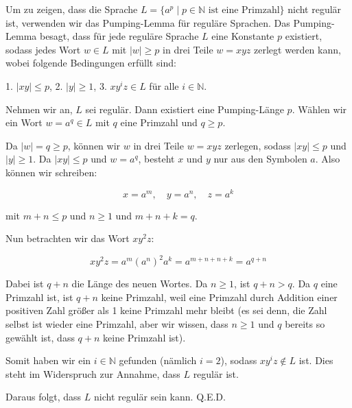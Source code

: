 \documentclass{uebungsblatt}
\begin{document}
\begin{loesung}
	Um zu zeigen, dass die Sprache $L = \{ a^p \mid p \in \mathbb{N} \text{ ist eine Primzahl} \} $ nicht regulär ist, verwenden wir das Pumping-Lemma für reguläre Sprachen. Das Pumping-Lemma besagt, dass für jede reguläre Sprache $L$ eine Konstante $p$ existiert, sodass jedes Wort $w \in L$ mit $|w| \geq p$ in drei Teile $w = xyz$ zerlegt werden kann, wobei folgende Bedingungen erfüllt sind:

	1. $|xy| \leq p$,
	2. $|y| \geq 1$,
	3. $xy^i z \in L$ für alle $i \in \mathbb{N}$.

	Nehmen wir an, $L$ sei regulär. Dann existiert eine Pumping-Länge $p$. Wählen wir ein Wort $w = a^q \in L$ mit $q$ eine Primzahl und $q \geq p$.

	Da $|w| = q \geq p$, können wir $w$ in drei Teile $w = xyz$ zerlegen, sodass $|xy| \leq p$ und $|y| \geq 1$. Da $|xy| \leq p$ und $w = a^q$, besteht $x$ und $y$ nur aus den Symbolen $a$. Also können wir schreiben:

	$$x = a^m, \quad y = a^n, \quad z = a^k$$

	mit $m + n \leq p$ und $n \geq 1$ und $m + n + k = q$.

	Nun betrachten wir das Wort $xy^2z$:

	$$xy^2z = a^m (a^n)^2 a^k = a^{m+n+n+k} = a^{q+n}$$

	Dabei ist $q+n$ die Länge des neuen Wortes. Da $n \geq 1$, ist $q+n > q$. Da $q$ eine Primzahl ist, ist $q+n$ keine Primzahl, weil eine Primzahl durch Addition einer positiven Zahl größer als 1 keine Primzahl mehr bleibt (es sei denn, die Zahl selbst ist wieder eine Primzahl, aber wir wissen, dass $n \geq 1$ und $q$ bereits so gewählt ist, dass $q+n$ keine Primzahl ist).

	Somit haben wir ein $i \in \mathbb{N}$ gefunden (nämlich $i = 2$), sodass $xy^i z \notin L$ ist. Dies steht im Widerspruch zur Annahme, dass $L$ regulär ist.

	Daraus folgt, dass $L$ nicht regulär sein kann. Q.E.D.

\end{loesung}
\end{document}
